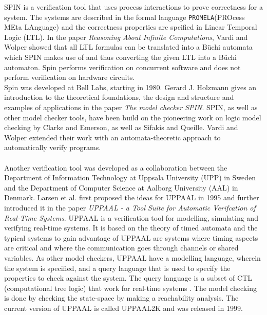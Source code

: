 SPIN\cite{spin} is a verification tool that uses process interactions to prove correctness for a system. The systems are described in the formal language \texttt{PROMELA}(PROcess MEta LAnguage)\cite{Holzmann1991} and the correctness properties are spcified in Linear Temporal Logic (LTL)\cite{Pnueli1977}. In the paper \textit{Reasoning About Infinite Computations}\cite{Vardi1994}, Vardi and Wolper showed that all LTL formulas can be translated into a B\"uchi automata which SPIN makes use of and thus converting the given LTL into a B\"uchi automaton. Spin performs verification on concurrent software and does not perform verification on hardware circuits. \\
Spin was developed at Bell Labs, starting in 1980. Gerard J. Holzmann gives an introduction to the theoretical foundations, the design and structure and examples of applications in the paper \textit{The model checker SPIN}\cite{Holzmann1997}. SPIN, as well as other model checker tools, have been build on the pioneering work on logic model checking by Clarke and Emerson\cite{Clarke1981}, as well as Sifakis and Queille\cite{Queille1982}.  Vardi and Wolper extended their work with an automata-theoretic approach to automatically verify programs\cite{Vardi1986}.\\\\
Another verification tool was developed as a collaboration between the Department of Information Technology at Uppsala University (UPP) in Sweden and the Department of Computer Science at Aalborg University (AAL) in Denmark. Larsen et al. first proposed the ideas for UPPAAL\cite{Larsen1995} in 1995 and further introduced it in the paper \textit{UPPAAL - a Tool Suite for Automatic Verifcation of Real-Time Systems}\cite{Bengtsson1995}.
UPPAAL is a verification tool for modelling, simulating and verifying real-time systems.
It is based on the theory of timed automata\cite{Hopcroft2001}\cite{Alur1990} and the typical systems to gain advantage of UPPAAL are systems where timing aspects are critical and where the communication goes through channels or shared variables.
As other model checkers, UPPAAL have a modelling language, wherein the system is specified, and a query language that is used to specify the properties to check against the system. The query language is a subset of CTL (computational tree logic) that work for real-time systems\cite{Henzinger1994} \cite{Larsen1995}. The model checking is done by checking the state-space by making a reachability analysis. The current version of UPPAAL is called UPPAAL2K and was released in 1999\cite{Amnell2001}. \\\\
